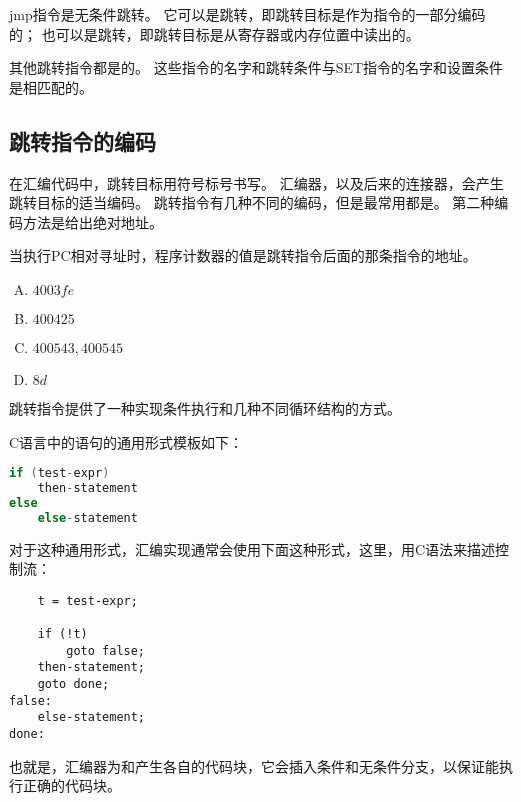 {{        jmp指令是无条件跳转。
        它可以是跳转，即跳转目标是作为指令的一部分编码的；
        也可以是跳转，即跳转目标是从寄存器或内存位置中读出的。

        其他跳转指令都是的。
        这些指令的名字和跳转条件与SET指令的名字和设置条件是相匹配的。
    }

    \subsection{跳转指令的编码}
    {
        在汇编代码中，跳转目标用符号标号书写。
        汇编器，以及后来的连接器，会产生跳转目标的适当编码。
        跳转指令有几种不同的编码，但是最常用都是。
        第二种编码方法是给出绝对地址。

        当执行PC相对寻址时，程序计数器的值是跳转指令后面的那条指令的地址。

        \begin{practicec}
            \begin{enumerate}[A.]
                \item $4003fe$
                \item $400425$
                \item $400543, 400545$
                \item $8d$
            \end{enumerate}
        \end{practicec}

        跳转指令提供了一种实现条件执行和几种不同循环结构的方式。

        C语言中的语句的通用形式模板如下：

        \begin{lstlisting}[language=C]
if (test-expr)
    then-statement
else
    else-statement
        \end{lstlisting}

        对于这种通用形式，汇编实现通常会使用下面这种形式，这里，用C语法来描述控制流：

        \begin{lstlisting}
    t = test-expr;

    if (!t)
        goto false;
    then-statement;
    goto done;
false:
    else-statement;
done:
        \end{lstlisting}

        也就是，汇编器为和产生各自的代码块，它会插入条件和无条件分支，以保证能执行正确的代码块。

}}
